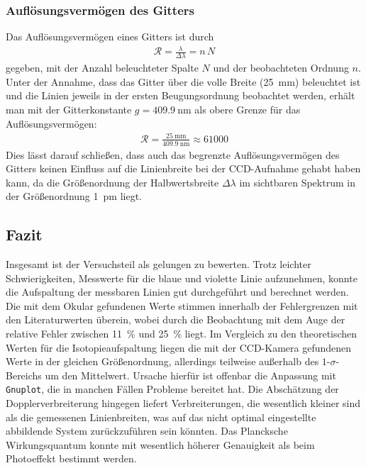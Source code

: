 \documentclass[11pt, a4paper]{article}
\numberwithin{equation}{section}
\begin{document}
\subsubsection{Auflösungsvermögen des Gitters}
Das Auflösungsvermögen eines Gitters ist durch
\begin{align*}
\mathcal{R}=\frac{\lambda}{\Delta\lambda}=n\,N
\end{align*}
gegeben, mit der Anzahl beleuchteter Spalte $N$ und der beobachteten Ordnung $n$. Unter der Annahme, dass das Gitter über die volle Breite (\SI{25}{\milli\metre}) beleuchtet ist und die Linien jeweils in der ersten Beugungsordnung beobachtet werden, erhält man mit der Gitterkonstante $g=\SI{409.9}{\nano\metre}$ als obere Grenze für das Auflösungsvermögen:
\begin{align*}
\mathcal{R} = \frac{\SI{25}{\milli\metre}}{\SI{409.9}{\nano\metre}} \approx 61000
\end{align*}
Dies lässt darauf schließen, dass auch das begrenzte Auflösungsvermögen des Gitters keinen Einfluss auf die Linienbreite bei der CCD-Aufnahme gehabt haben kann, da die Größenordnung der Halbwertsbreite $\Delta \lambda$ im sichtbaren Spektrum in der Größenordnung \SI{1}{\pico\metre} liegt.

\subsection{Fazit}
Insgesamt ist der Versuchsteil als gelungen zu bewerten.
Trotz leichter Schwierigkeiten, Messwerte für die blaue und violette Linie aufzunehmen, konnte die Aufspaltung der messbaren Linien gut durchgeführt und berechnet werden.
Die mit dem Okular gefundenen Werte stimmen innerhalb der Fehlergrenzen mit den Literaturwerten überein, wobei durch die Beobachtung mit dem Auge der relative Fehler zwischen \SI{11}{\percent} und \SI{25}{\percent} liegt.
Im Vergleich zu den theoretischen Werten für die Isotopieaufspaltung liegen die mit der CCD-Kamera gefundenen Werte in der gleichen Größenordnung, allerdings teilweise außerhalb des $1$-$\sigma$-Bereichs um den Mittelwert.
Ursache hierfür ist offenbar die Anpassung mit \texttt{Gnuplot}, die in manchen Fällen Probleme bereitet hat.
Die Abschätzung der Dopplerverbreiterung hingegen liefert Verbreiterungen, die wesentlich kleiner sind als die gemessenen Linienbreiten, was auf das nicht optimal eingestellte abbildende System zurückzuführen sein könnten.
Das Plancksche Wirkungsquantum konnte mit wesentlich höherer Genauigkeit als beim Photoeffekt bestimmt werden.
\end{document}
